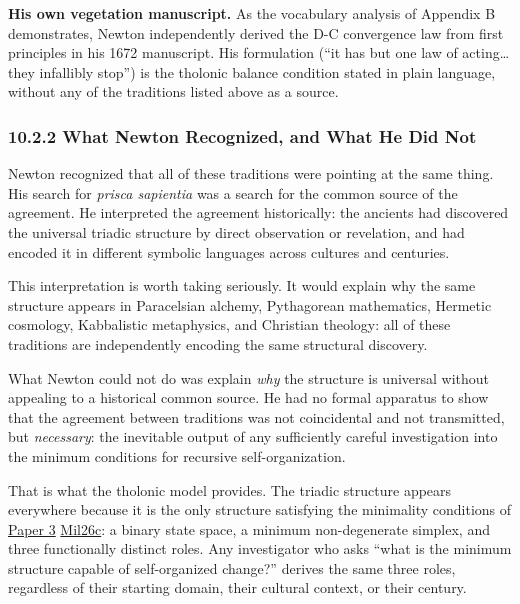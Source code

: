 \documentclass[
  11pt,
  letterpaper,
]{article}
\begin{document}
\textbf{His own vegetation manuscript.} As the vocabulary analysis of
Appendix B demonstrates, Newton independently derived the D-C
convergence law from first principles in his 1672 manuscript. His
formulation (``it has but one law of acting\ldots{} they infallibly
stop'') is the tholonic balance condition stated in plain language,
without any of the traditions listed above as a source.

\subsubsection{10.2.2 What Newton Recognized, and What He Did
Not}\label{what-newton-recognized-and-what-he-did-not}

Newton recognized that all of these traditions were pointing at the same
thing. His search for \emph{prisca sapientia} was a search for the
common source of the agreement. He interpreted the agreement
historically: the ancients had discovered the universal triadic
structure by direct observation or revelation, and had encoded it in
different symbolic languages across cultures and centuries.

This interpretation is worth taking seriously. It would explain why the
same structure appears in Paracelsian alchemy, Pythagorean mathematics,
Hermetic cosmology, Kabbalistic metaphysics, and Christian theology: all
of these traditions are independently encoding the same structural
discovery.

What Newton could not do was explain \emph{why} the structure is
universal without appealing to a historical common source. He had no
formal apparatus to show that the agreement between traditions was not
coincidental and not transmitted, but \emph{necessary}: the inevitable
output of any sufficiently careful investigation into the minimum
conditions for recursive self-organization.

That is what the tholonic model provides. The triadic structure appears
everywhere because it is the only structure satisfying the minimality
conditions of
\href{https://github.com/baardev/truevalue/blob/main/docnav/Research/papers/3_minimal-recursive-triadic-framework/3_minimal-recursive-triadic-framework.pdf}{Paper
3}
\href{https://github.com/baardev/truevalue/blob/main/docnav/Research/papers/3_minimal-recursive-triadic-framework/3_minimal-recursive-triadic-framework.pdf}{Mil26c}:
a binary state space, a minimum non-degenerate simplex, and three
functionally distinct roles. Any investigator who asks ``what is the
minimum structure capable of self-organized change?'' derives the same
three roles, regardless of their starting domain, their cultural
context, or their century.
\end{document}
